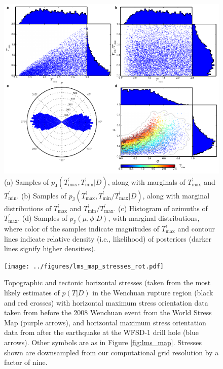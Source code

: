 \documentclass[draft,jgrga]{AGUTeX}
\begin{document}
\begin{figure}[t]
\centering
\includegraphics[width=40pc]{../figures/joint_pdfs.pdf}
\caption{(a) Samples of
$p_{\mathrm{J}}(T^\prime_{\mathrm{max}},T^\prime_{\mathrm{min}} | D)$,
along with marginals of $T^\prime_{\mathrm{max}}$ and
$T^\prime_{\mathrm{min}}$. (b) Samples of
$p_{\mathrm{J}}(T^\prime_{\mathrm{\max}}, T^\prime_{\mathrm{\min}}/T^\prime_{\mathrm{max}} | D)$,
along with marginal distributions of $T^\prime_{\mathrm{max}}$ and
$T^\prime_{\mathrm{min}} / T^\prime_{\mathrm{max}}$. (c) Histogram of
azimuths of $T^\prime_{\mathrm{\max}}$. (d) Samples of
$p_{\mathrm{J}}(\mu, \phi | D)$, with marginal distributions,
where color of the samples
indicate magnitudes of $T^\prime_{\mathrm{\max}}$ and contour
lines indicate relative density (i.e., likelihood) of posteriors (darker
lines signify higher densities).}
\label{fig:joint_posteriors}
\end{figure}

\begin{figure}[t]
\centering
\texttt{[image: ../figures/lms\_map\_stresses\_rot.pdf]}
\caption{Topographic and tectonic horizontal stresses (taken from the
most likely estimates of $p(T|D)$ in the Wenchuan rupture region (black
and red crosses) with horizontal maximum stress orientation data taken
from before the 2008 Wenchuan event from the World Stress Map
\citep{heidbach2009} (purple arrows), and horizontal maximum stress
orientation data from after the earthquake at the WFSD-1 drill hole
\citep{cui2014} (blue arrows). Other symbols are as in Figure
\ref{fig:lms_map}. Stresses shown are downsampled from our computational 
grid resolution by a factor of nine.}
\label{fig:lms_stress_map}
\end{figure}
\end{document}

